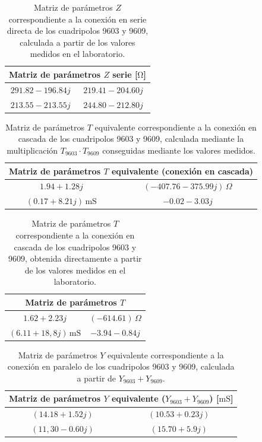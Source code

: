 \begin{table}[H]
\centering
\begin{tabular}{|c|c|}
\hline
\multicolumn{2}{|c|}{\textbf{Matriz de parámetros $Z$ serie [$\mathrm{\Omega}$]}} \\ \hline
$291.82 - 196.84j\,$ & $219.41 - 204.60j\,$ \\ \hline
$213.55 - 213.55j\,$ & $244.80 - 212.80j\,$ \\ \hline
\end{tabular}
\caption{Matriz de parámetros $Z$ correspondiente a la conexión en serie directa de los cuadripolos 9603 y 9609, calculada a partir de los valores medidos en el laboratorio.}
\label{tab:matriz_Z_serie_directa}
\end{table}

\begin{table}[H]
\centering
\begin{tabular}{|c|c|}
\hline
\multicolumn{2}{|c|}{\textbf{Matriz de parámetros $T$ equivalente (conexión en cascada)}} \\ \hline
$1.94 + 1.28j$ & $(-407.76 - 375.99j)\,\Omega$ \\ \hline
$(0.17 + 8.21j)\,\mathrm{mS}$ & $-0.02 - 3.03j$ \\ \hline
\end{tabular}
\caption{Matriz de parámetros $T$ equivalente correspondiente a la conexión en cascada de los cuadripolos 9603 y 9609, calculada mediante la multiplicación $T_{9603} \cdot T_{9609}$ conseguidas mediante los valores medidos.}
\label{tab:matriz_T_cascada_procuto}
\end{table}

\begin{table}[H]
\centering
\begin{tabular}{|c|c|}
\hline
\multicolumn{2}{|c|}{\textbf{Matriz de parámetros $T$ }} \\ \hline
$1.62 + 2.23j$ & $(-614.61)\,\Omega$ \\ \hline
$(6.11 + 18,8j)\,\mathrm{mS}$ & $-3.94 - 0.84j$ \\ \hline
\end{tabular}
\caption{Matriz de parámetros $T$ correspondiente a la conexión en cascada de los cuadripolos 9603 y 9609, obtenida directamente a partir de los valores medidos en el laboratorio.}
\label{tab:matriz_T_cascada_directa}
\end{table}

\begin{table}[H]
\centering
\begin{tabular}{|c|c|}
\hline
\multicolumn{2}{|c|}{\textbf{Matriz de parámetros $Y$ equivalente ($Y_{9603} + Y_{9609}$) [$\mathrm{mS}$] }} \\ \hline
$(14.18 + 1.52j)\,$ & $(10.53 + 0.23j)\,$ \\ \hline
$(11,30 - 0.60j)\,$ & $(15.70 + 5.9j)\,$ \\ \hline
\end{tabular}
\caption{Matriz de parámetros $Y$ equivalente correspondiente a la conexión en paralelo de los cuadripolos 9603 y 9609, calculada a partir de $Y_{9603} + Y_{9609}$.}
\label{tab:matriz_Y_paralelo_suma}
\end{table}

